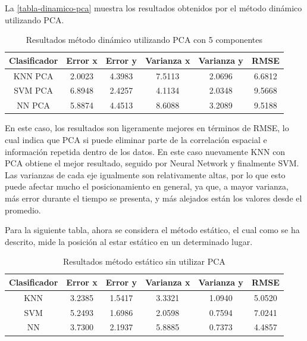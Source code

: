 La \autoref{tabla-dinamico-pca} muestra los resultados obtenidos por el método dinámico utilizando PCA.

\begin{table}[!ht]
\centering
\caption[Resultados método dinámico utilizando PCA con 5 componentes]{Resultados método dinámico utilizando PCA con 5 componentes}
\label{tabla-dinamico-pca}
\begin{tabular}{|c|c|c|c|c|c|}
\hline
Clasificador & Error x & Error y & Varianza x & Varianza y & RMSE   \\ \hline
KNN PCA      & 2.0023  & 4.3983  & 7.5113     & 2.0696     & 6.6812 \\ \hline
SVM PCA      & 6.8948  & 2.4257  & 4.1134     & 2.0348     & 9.5668 \\ \hline
NN PCA       & 5.8874  & 4.4513  & 8.6088     & 3.2089     & 9.5188 \\ \hline
\end{tabular}
\end{table}

En este caso, los resultados son ligeramente mejores en términos de RMSE, lo cual indica que PCA si puede eliminar parte de la correlación espacial e información repetida dentro de los datos. En este caso nuevamente KNN con PCA obtiene el mejor resultado, seguido por Neural Network y finalmente SVM. Las varianzas de cada eje igualmente son relativamente altas, por lo que esto puede afectar mucho el posicionamiento en general, ya que, a mayor varianza, más error durante el tiempo se presenta, y más alejados están los valores desde el promedio.

Para la siguiente tabla, ahora se considera el método estático, el cual como se ha descrito, mide la posición al estar estático en un determinado lugar. 

\begin{table}[!h]
\centering
\caption[Resultados método estático sin utilizar PCA]{Resultados método estático sin utilizar PCA}
\label{tabla-estatica}
\begin{tabular}{|c|c|c|c|c|c|}
\hline
Clasificador & Error x & Error y & Varianza x & Varianza y & RMSE   \\ \hline
KNN          & 3.2385  & 1.5417  & 3.3321     & 1.0940     & 5.0520 \\ \hline
SVM          & 5.2493  & 1.6986  & 2.0598     & 0.7594     & 7.0241 \\ \hline
NN           & 3.7300  & 2.1937  & 5.8885     & 0.7373     & 4.4857 \\ \hline
\end{tabular}
\end{table}

